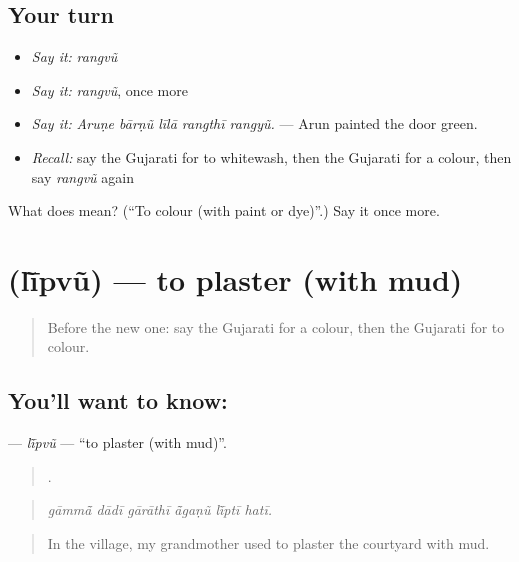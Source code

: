 \subsection*{Your turn}
\begin{itemize}
\raggedright
  \item \emph{Say it:} \emph{rangvũ}
  \item \emph{Say it:} \emph{rangvũ}, once more
  \item \emph{Say it:} \emph{Aruṇe bārṇũ līlā rangthī rangyũ.} — Arun painted the door green.
  \item \emph{Recall:} say the Gujarati for to whitewash, then the Gujarati for a colour, then say \emph{rangvũ} again
\end{itemize}

\begin{tcolorbox}[breakable,colback=teal!4,colframe=teal!35!black,title={Before you move on}]
What does  mean? (\textquotedblleft{}To colour (with paint or dye)\textquotedblright{}.) Say it once more.
\end{tcolorbox}
\section[\texorpdfstring{\gu{લીંપવું} (lī̃pvũ)}{લીંપવું (lī̃pvũ)}]{ (lī̃pvũ) — to plaster (with mud)}

\label{lesson:GU-C516-lipvu}



\begin{quote}
Before the new one: say the Gujarati for a colour, then the Gujarati for to colour.
\end{quote}

\subsection*{You'll want to know: }
\textbf{} — \emph{lī̃pvũ} — \textquotedblleft{}to plaster (with mud)\textquotedblright{}.

\begin{quote}
     .
\end{quote}

\begin{quote}
\emph{gāmmā̃ dādī gārāthī ā̃gaṇũ lī̃ptī hatī.}
\end{quote}

\begin{quote}
In the village, my grandmother used to plaster the courtyard with mud.
\end{quote}

